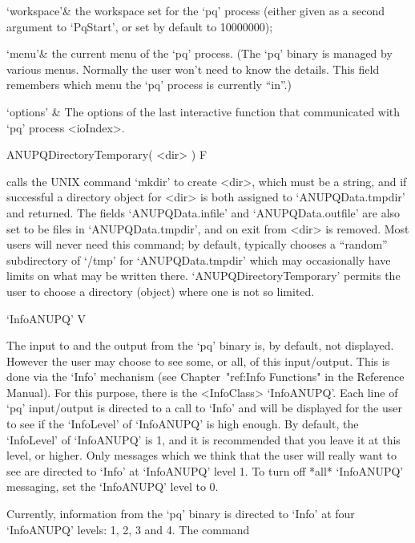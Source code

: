 \quad`workspace'& the workspace set for the `pq' process (either given as
a second argument to `PqStart', or set by default to 10000000);

\quad`menu'& the current menu of the `pq' process. (The  `pq'  binary  is
managed by various menus. Normally  the  user  won't  need  to  know  the
details. This field remembers which menu the `pq'  process  is  currently
``in''.)

\quad`options' & The  options  of  the  last  interactive  function  that
communicated with `pq' process <ioIndex>.

\enditems

\>ANUPQDirectoryTemporary( <dir> ) F

calls the UNIX command `mkdir' to create <dir>, which must be  a  string,
and if successful a directory  object  for  <dir>  is  both  assigned  to
`ANUPQData.tmpdir'  and  returned.  The  fields  `ANUPQData.infile'   and
`ANUPQData.outfile' are also set to be files in  `ANUPQData.tmpdir',  and
on exit from {\GAP} <dir> is removed. Most users  will  never  need  this
command; by default, {\GAP} typically chooses a  ``random''  subdirectory
of `/tmp' for `ANUPQData.tmpdir' which may occasionally  have  limits  on
what may be written there. `ANUPQDirectoryTemporary' permits the user  to
choose a directory (object) where one is not so limited.


\>`InfoANUPQ' V

The input to and the output from the `pq'  binary  is,  by  default,  not
displayed. However the user may choose to  see  some,  or  all,  of  this
input/output.   This   is   done   via   the   `Info'   mechanism    (see
Chapter~"ref:Info Functions" in the {\GAP} Reference  Manual).  For  this
purpose,  there  is  the  <InfoClass>  `InfoANUPQ'.  Each  line  of  `pq'
input/output is directed to a call to `Info' and will  be  displayed  for
the user to see if the `InfoLevel' of  `InfoANUPQ'  is  high  enough.  By
default, the `InfoLevel' of `InfoANUPQ' is 1, and it is recommended  that
you leave it at this level, or higher. Only messages which we think  that
the user will really want to see are directed to  `Info'  at  `InfoANUPQ'
level 1. To turn off *all* `InfoANUPQ'  messaging,  set  the  `InfoANUPQ'
level to 0.

Currently, information from the `pq' binary is directed to `Info' at four
`InfoANUPQ' levels: 1, 2, 3 and 4. The command

